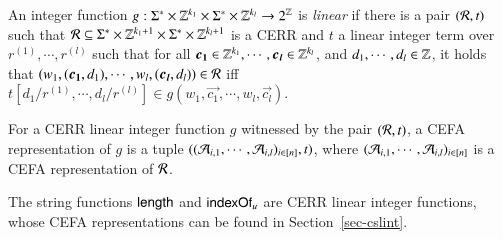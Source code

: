 

\begin{definition}
An integer function $g: \Sigma^* \times \mathbb{Z}^{k_1} \times \Sigma^* \times \mathbb{Z}^{k_l} \rightarrow 2^{\mathbb{Z}}$ is  \emph{linear} if there is a pair $(\mathcal{R}, t)$ such that $\mathcal{R} \subseteq \Sigma^* \times \mathbb{Z}^{k_1+1} \times \Sigma^* \times \mathbb{Z}^{k_l+1}$ is a CERR and $t$ a linear integer term over $r^{(1)}, \cdots, r^{(l)}$ such that for all $\vec{c_1} \in \intnum^{k_1}, \cdots, \vec{c_l} \in \intnum^{k_l}$, and $d_1, \cdots, d_l \in \mathbb{Z}$, it holds that $(w_1, (\vec{c_1}, d_1), \cdots, w_l, (\vec{c_l}, d_l)) \in \cR$ iff $t[d_1/r^{(1)}, \cdots, d_l/r^{(l)}] \in g(w_1, \vec{c_1}, \cdots, w_l, \vec{c_l})$.  

For a CERR linear integer function $g$ witnessed by the pair $(\mathcal{R}, t)$, a CEFA representation of $g$ is a tuple $((\mathcal{A}_{i,1}, \cdots, \mathcal{A}_{i, l})_{i \in [n]}, t)$, where $(\mathcal{A}_{i,1}, \cdots, \mathcal{A}_{i, l})_{i \in [n]}$ is a CEFA representation of $\mathcal{R}$.

\end{definition}

\begin{example}
The string functions $\mathsf{length}$ and $\mathsf{indexOf}_u$ are CERR linear integer functions, whose CEFA representations can be found in Section~\ref{sec-cslint}.
\end{example}

